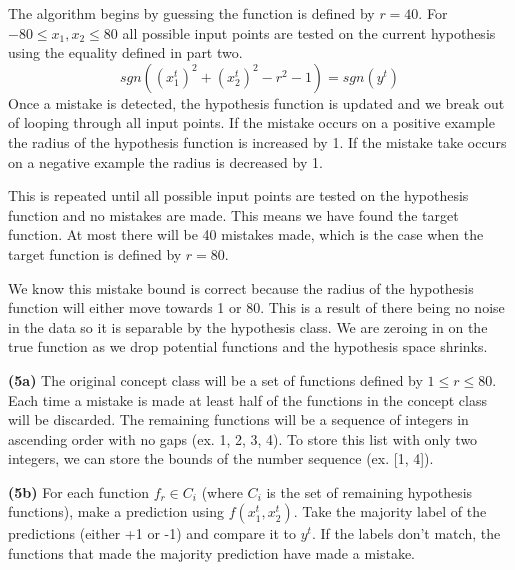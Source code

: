 \documentclass[11pt]{article}
\renewcommand\part[1]{\vspace{.10in}\textbf{(#1)}}
\begin{document}
The algorithm begins by guessing the function is defined by $r = 40$. For $-80 \leq x_1, x_2 \leq 80$ all possible input points are tested on the current hypothesis using the equality defined in part two.
$$sgn((x_1^t)^2 + (x_2^t)^2 - r^2 - 1) = sgn(y^t)$$
Once a mistake is detected, the hypothesis function is updated and we break out of looping through all input points. If the mistake occurs on a positive example the radius of the hypothesis function is increased by 1. If the mistake take occurs on a negative example the radius is decreased by 1.

This is repeated until all possible input points are tested on the hypothesis function and no mistakes are made. This means we have found the target function. At most there will be 40 mistakes made, which is the case when the target function is defined by $r = 80$. 

We know this mistake bound is correct because the radius of the hypothesis function will either move towards 1 or 80. This is a result of there being no noise in the data so it is separable by the hypothesis class. We are zeroing in on the true function as we drop potential functions and the hypothesis space shrinks.


\part{5a} The original concept class will be a set of functions defined by $1 \leq r \leq 80$. Each time a mistake is made at least half of the functions in the concept class will be discarded. The remaining functions will be a sequence of integers in ascending order with no gaps (ex. 1, 2, 3, 4). To store this list with only two integers, we can store the bounds of the number sequence (ex. [1, 4]).


\part{5b} For each function $f_r \in C_i$ (where $C_i$ is the set of remaining hypothesis functions), make a prediction using $f(x_1^t, x_2^t)$. Take the majority label of the predictions (either +1 or -1) and compare it to $y^t$. If the labels don't match, the functions that made the majority prediction have made a mistake.
\end{document}
